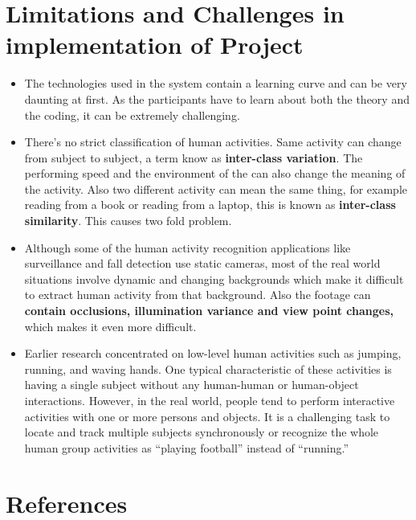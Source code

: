 \documentclass[11pt]{article}
\begin{document}
\section{\textbf{Limitations and Challenges in implementation of Project}}
\begin{itemize}
	\item  The technologies used in the system contain a learning curve and can be very daunting at first. As the participants have to learn about both the theory and the coding, it can be extremely challenging.
	
	\item There's no strict classification of human activities. Same activity can change from subject to subject, a term know as \textbf{inter-class variation}. The performing speed and the environment of the can also change the meaning of the activity. Also two different activity can mean the same thing, for example reading from a book or reading from a laptop, this is known as \textbf{inter-class similarity}. This causes two fold problem.
	
	\item Although some of the human activity recognition applications like surveillance and fall detection use static cameras, most of the real world situations involve dynamic and changing backgrounds which make it difficult to extract human activity from that background. Also the footage can \textbf{contain occlusions, illumination variance and view point changes,} which makes it even more difficult. 
	
	\item Earlier research concentrated on low-level human activities such as jumping, running, and waving hands. One typical characteristic of these activities is having a single subject without any human-human or human-object interactions. However, in the real world, people tend to perform interactive activities with one or more persons and objects.
	It is a challenging task to locate and track multiple subjects synchronously or recognize the whole human group activities as “playing football” instead of “running.”
\end{itemize}


\section{\textbf{References}}
\end{document}

